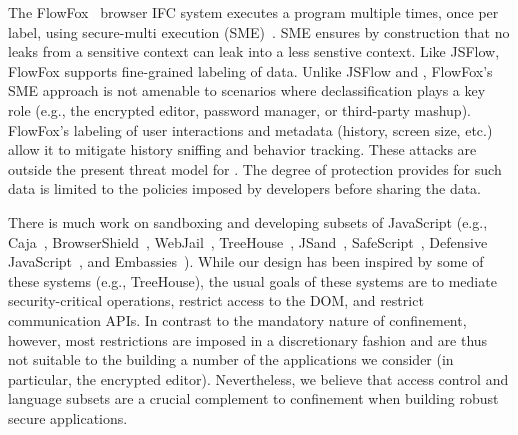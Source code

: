 The FlowFox~\cite{DeGroef:2012} browser IFC system executes a
program multiple times, once per label, using secure-multi execution
(SME)~\cite{Devriese:2010}. SME ensures by construction that no leaks
from a sensitive context can leak into a less senstive context.
%
Like JSFlow, FlowFox supports fine-grained labeling of data.
%
Unlike JSFlow and \sys{}, FlowFox's SME approach is not amenable to
scenarios where declassification plays a key role (e.g., the encrypted
editor, password manager, or third-party mashup).
%
FlowFox's labeling of user interactions and metadata (history, screen
size, etc.) allow it to mitigate history sniffing and behavior
tracking.
%
These attacks are outside the present threat model for \sys{}.  The
degree of protection \sys{} provides for such data is limited to the
policies imposed by developers before sharing the data.

%



There is much work on sandboxing and developing subsets of JavaScript (e.g.,
Caja~\cite{GoogleCaja}, BrowserShield~\cite{Reis:2007},
WebJail~\cite{VanAcker:2011}, TreeHouse~\cite{Ingram:2012},
JSand~\cite{Agten:2012:JCC}, SafeScript~\cite{SafeScript}, Defensive
JavaScript~\cite{djs}, and Embassies~\cite{Howell:2013}). 
%
While our design has been inspired by some of these systems (e.g.,
TreeHouse), the usual goals of these systems are to mediate
security-critical operations, restrict access to the DOM, and restrict
communication APIs\@.
%
In contrast to the mandatory nature of confinement, however, most restrictions
are imposed in a discretionary fashion and are thus not suitable to the
building a number of the applications we consider (in particular, the encrypted
editor).
%
Nevertheless, we believe that access control and language subsets are a crucial
complement to confinement when building robust secure applications.




